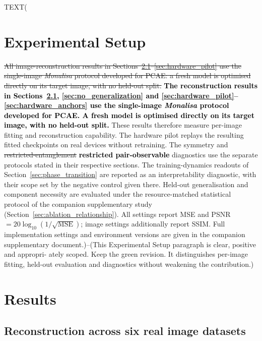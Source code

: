 \documentclass[pdflatex,sn-basic]{sn-jnl}
\newcommand{\del}[1]{\sout{#1}}
\newcommand{\add}[1]{\textbf{\textcolor{black}{#1}}}
\begin{document}
TEXT(
\section{Experimental Setup}
\label{sec:protocol}

\color{green}
\del{All image-reconstruction results in
Sections~\ref{sec:sameset_results}--\ref{sec:hardware_pilot} use the single-image
\textit{Monalisa} protocol developed for PCAE: a fresh model is optimised directly
on its target image, with no held-out split.} \add{The reconstruction results in
Sections~\ref{sec:sameset_results}, \ref{sec:no_generalization} and
\ref{sec:hardware_pilot}--\ref{sec:hardware_anchors} use the single-image
\textit{Monalisa} protocol developed for PCAE. A fresh model is optimised
directly on its target image, with no held-out split.} These results therefore measure
per-image fitting and reconstruction capability. The hardware pilot replays the
resulting fitted checkpoints on real devices without retraining. The symmetry
and \del{restricted-entanglement} \add{restricted pair-observable} diagnostics use the separate protocols stated in
their respective sections. The training-dynamics
readouts of Section~\ref{sec:phase_transition} are reported as an
interpretability diagnostic, with their scope set by the negative control given
there. Held-out generalisation and component necessity are evaluated under the
resource-matched statistical protocol of the companion supplementary study
(Section~\ref{sec:ablation_relationship}). All settings report MSE and
PSNR $=20\log_{10}(1/\sqrt{\mathrm{MSE}})$; image settings
additionally report SSIM. Full implementation settings and environment versions
are given in the companion supplementary document.)--(This Experimental Setup paragraph is clear, positive and appropri-
ately scoped. Keep the green revision. It distinguishes per-image fitting, held-out
evaluation and diagnostics without weakening the contribution.)
\color{black}

\section{Results}
\label{sec:results}

\color{blue}
\subsection{Reconstruction across six real image datasets}
\label{sec:sameset_results}
\end{document}
